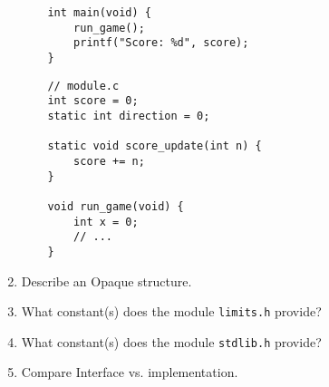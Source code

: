 \documentclass{article}
\begin{document}
\begin{enumerate}
\begin{minipage}{.5\textwidth}
\begin{lstlisting}
    int main(void) {
        run_game();
        printf("Score: %d", score);
    }
    \end{lstlisting}
    \end{minipage}%
    \begin{minipage}{.5\textwidth}
    \begin{lstlisting}
    // module.c
    int score = 0;
    static int direction = 0;
    
    static void score_update(int n) {
        score += n;
    }
    
    void run_game(void) {
        int x = 0;
        // ...
    }
    \end{lstlisting}
    \end{minipage}


    \item Describe an Opaque structure.
    \vspace{16mm}
    \item What constant(s) does the module \texttt{limits.h} provide?
    \vspace{16mm}
    \item What constant(s) does the module \texttt{stdlib.h} provide?
    \vspace{16mm}
    \item Compare Interface vs. implementation.
    \vspace{16mm}


\end{enumerate}
\end{document}
